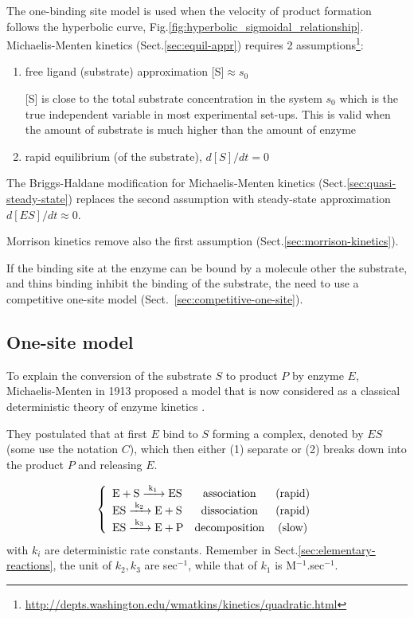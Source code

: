 The one-binding site model is used when the velocity of product formation
follows the hyperbolic curve, Fig.\ref{fig:hyperbolic_sigmoidal_relationship}.
Michaelis-Menten kinetics (Sect.\ref{sec:equil-appr}) requires 2
assumptions\footnote{\url{http://depts.washington.edu/wmatkins/kinetics/quadratic.html}}:
\begin{enumerate}
\item free ligand (substrate) approximation [S]$\approx s_0$

[S] is close to the total substrate concentration in the system $s_0$ which is
the true independent variable in most experimental set-ups. This is valid when
the amount of substrate is much higher than the amount of enzyme

\item rapid equilibrium (of the substrate), $d[S]/dt=0$
\end{enumerate}

The Briggs-Haldane modification for Michaelis-Menten kinetics
(Sect.\ref{sec:quasi-steady-state}) replaces the second assumption with
steady-state approximation $d[ES]/dt\approx 0$. 

Morrison kinetics remove also the first assumption
(Sect.\ref{sec:morrison-kinetics}).

If the binding site at the enzyme can be bound by a molecule other the
substrate, and thins binding inhibit the binding of the substrate, the need to
use a competitive one-site model (Sect.~\ref{sec:competitive-one-site}).

\subsection{One-site model}
\label{sec:mich-ment-kinet}

To explain the conversion of the substrate $S$ to product $P$ by enzyme $E$,
Michaelis-Menten in 1913 proposed a model that is now considered as a classical
deterministic theory of enzyme kinetics \citep{michaelis1913kir}.

They postulated that at first $E$ bind to $S$ forming a complex, denoted by $ES$
(some use the notation $C$), which then either (1) separate or (2) breaks down
into the product $P$ and releasing $E$.

\begin{eqnarray}
  \label{eq:261}
  \left\{  
    \begin{array}{lcc}
      \ce{E + S ->[k_1] ES} & \text{association} & \text{(rapid)} \\
      \ce{ES ->[k_2] E + S} & \text{dissociation} & \text{(rapid)} \\
      \ce{ES ->[k_3] E + P} & \text{decomposition} & \text{(slow)}
    \end{array}
\right.
\end{eqnarray}
with $k_i$ are deterministic rate constants. Remember in
Sect.\ref{sec:elementary-reactions}, the unit of $k_2,k_3$ are sec$^{-1}$, while
that of $k_1$ is M$^{-1}$.sec$^{-1}$.


